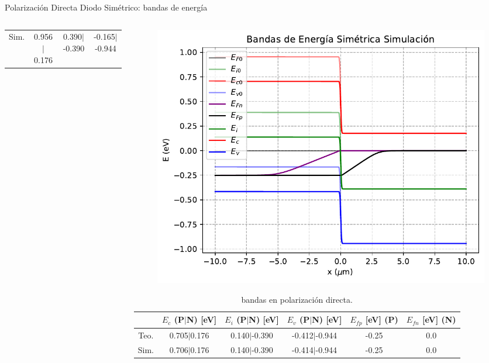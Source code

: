 \documentclass[aspectratio=169,xcolor=dvipsnames]{beamer}
\begin{document}
\begin{frame}{Polarización Directa Diodo Simétrico: bandas de energía}
\begin{columns}
\begin{column}{0.45\textwidth}
\begin{table}
\begin{tabular}{c|ccc}
                \tiny{Sim.} & \tiny{0.956$|$0.176} & \tiny{0.390$|$-0.390} &  \tiny{-0.165$|$-0.944} 
            \end{tabular}
        \end{table}
    \end{column}
    \begin{column}{0.45\textwidth} \begin{center}
        \vspace{-0.55cm}
        \begin{figure} \centering
            \includegraphics[width=1\linewidth]{Directa/Bandas_Energia-Directa.pdf}
        \end{figure}
        \vspace{-0.35cm}
        \begin{table}
            \caption{bandas en polarización directa.}
            \vspace{-0.48cm}
            \begin{tabular}{c|ccccc}
                & \tiny{$E_c$ (P$|$N)} \tiny{[eV]} & \tiny{$E_i$ (P$|$N)} \tiny{[eV]} & \tiny{$E_v$ (P$|$N)} \tiny{[eV]}  & \tiny{$E_{fp}$ [eV]} (P) & \tiny{$E_{fn}$ [eV]} (N) \\ \hline
    
                \tiny{Teo.} & \tiny{0.705$|$0.176} & \tiny{0.140$|$-0.390} & \tiny{-0.412$|$-0.944} & \tiny{-0.25} & \tiny{0.0} \\
                \tiny{Sim.} & \tiny{0.706$|$0.176} & \tiny{0.140$|$-0.390} & \tiny{-0.414$|$-0.944} & \tiny{-0.25} & \tiny{0.0} \\
            \end{tabular}
        \end{table}
    \end{center}
    \end{column}
    \hspace{2.3cm}
    \end{columns}
\end{frame}
\end{document}
